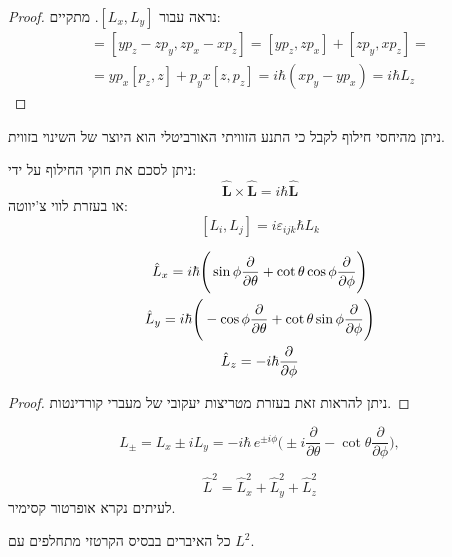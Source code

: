\documentclass{tstextbook}
\begin{document}
\begin{proof}
נראה עבור \([L_{x},L_{y}]\). מתקיים:
\begin{gather*}[L_{x},L_{y}]=[y p_{z}-z p_{y},z p_{x}-x p_{z}]=\left[y p_{z},z p_{x}\right]+\left[z p_{y},x p_{z}\right]=\\=y p_{x}[p_{z},z]+p_{y}x[z,p_{z}]=i\hbar(x p_{y}-y p_{x})=i\hbar L_{z} 
\end{gather*}

\end{proof}
\begin{corollary}
ניתן מהיחסי חילוף לקבל כי התנע הזוויתי האורביטלי הוא היוצר של השינוי בזווית.

\end{corollary}
\begin{remark}
ניתן לסכם את חוקי החילוף על ידי:
$$\hat{\mathbf{L}}\times\hat{\mathbf{L}}=i\hbar\hat{\mathbf{L}}$$
או בעזרת לווי צ'יווטה:
$$[L_{i},L_{j}]=i\varepsilon_{i j k}\hbar L_{k}$$

\end{remark}
\begin{proposition}
\begin{gather*}\hat{L}_{x}=i\hbar\Bigg(\sin\phi\frac{\partial}{\partial\theta}+\cot\theta\cos\phi\frac{\partial}{\partial\phi}\Bigg)\\\hat{L}_{y}=i\hbar\Bigg{(}-\cos\phi\frac{\partial}{\partial\theta}+\cot\theta\sin\phi\frac{\partial}{\partial\phi}\Bigg{)}\\\hat{L}_{z}=-i\hbar\frac{\partial}{\partial\phi} 
\end{gather*}

\end{proposition}
\begin{proof}
ניתן להראות זאת בעזרת מטריצות יעקובי של מעברי קורדינטות.

\end{proof}
\begin{proposition}
$$L_{\pm}=L_{x}\pm i L_{y}=-i\hbar\,e^{\pm i\phi}\Big(\pm i\frac{\partial}{\partial\theta}-\cot\theta\frac{\partial}{\partial\phi}\Big),$$

\end{proposition}
\begin{definition}
$$\hat{L}^{2}=\hat{L}_{x}^{2}+\hat{L}_{y}^{2}+\hat{L}_{z}^{2}$$
לעיתים נקרא אופרטור קסימיר.

\end{definition}
\begin{proposition}
כל האיברים בבסיס הקרטזי מתחלפים עם \(L^{2}\).

\end{proposition}
\end{document}
